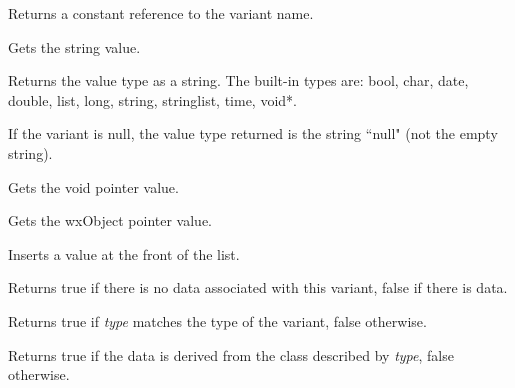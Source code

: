 Returns a constant reference to the variant name.

\label{wxvariantgetstring}


Gets the string value.

\label{wxvariantgettype}


Returns the value type as a string. The built-in types are: bool, char, date, double, list, long, string, stringlist, time, void*.

If the variant is null, the value type returned is the string ``null" (not the empty string).

\label{wxvariantgetvoidptr}


Gets the void pointer value.

\label{wxvariantgetwxobjectptr}


Gets the wxObject pointer value.

\label{wxvariantinsert}


Inserts a value at the front of the list.

\label{wxvariantisnull}


Returns true if there is no data associated with this variant, false if there is data.

\label{wxvariantistype}


Returns true if {\it type} matches the type of the variant, false otherwise.

\label{wxvariantisvaluekindof}


Returns true if the data is derived from the class described by {\it type}, false otherwise.

\label{wxvariantmakenull}

